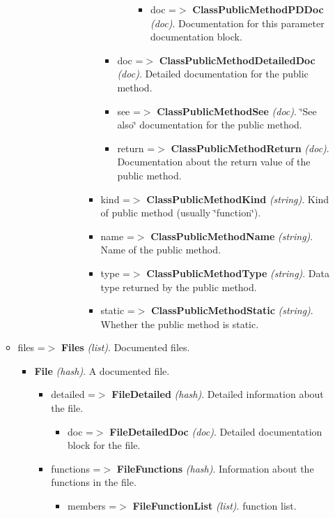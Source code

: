 \begin{itemize}
\begin{itemize}
\begin{itemize}
\begin{itemize}
\begin{itemize}
\begin{itemize}
\begin{itemize}
\begin{itemize}
\begin{itemize}
\begin{itemize}
\begin{itemize}
\end{itemize}
\item doc =$>$ {\bf ClassPublicMethodPDDoc} {\em (doc)\/}. Documentation for this parameter documentation block. \end{itemize}
\end{itemize}
\item doc =$>$ {\bf ClassPublicMethodDetailedDoc} {\em (doc)\/}. Detailed documentation for the public method. \item see =$>$ {\bf ClassPublicMethodSee} {\em (doc)\/}. \char`\"{}See also\char`\"{} documentation for the public method. \item return =$>$ {\bf ClassPublicMethodReturn} {\em (doc)\/}. Documentation about the return value of the public method. \end{itemize}
\item kind =$>$ {\bf ClassPublicMethodKind} {\em (string)\/}. Kind of public method (usually \char`\"{}function\char`\"{}). \item name =$>$ {\bf ClassPublicMethodName} {\em (string)\/}. Name of the public method. \item type =$>$ {\bf ClassPublicMethodType} {\em (string)\/}. Data type returned by the public method. \item static =$>$ {\bf ClassPublicMethodStatic} {\em (string)\/}. Whether the public method is static. \end{itemize}
\end{itemize}
\end{itemize}
\end{itemize}
\end{itemize}
\item files =$>$ {\bf Files} {\em (list)\/}. Documented files. \begin{itemize}
\item {\bf File} {\em (hash)\/}. A documented file. \begin{itemize}
\item detailed =$>$ {\bf FileDetailed} {\em (hash)\/}. Detailed information about the file. \begin{itemize}
\item doc =$>$ {\bf FileDetailedDoc} {\em (doc)\/}. Detailed documentation block for the file. \end{itemize}
\item functions =$>$ {\bf FileFunctions} {\em (hash)\/}. Information about the functions in the file. \begin{itemize}
\item members =$>$ {\bf FileFunctionList} {\em (list)\/}. function list. \begin{itemize}

\end{itemize}
\end{itemize}
\end{itemize}
\end{itemize}
\end{itemize}
\end{itemize}
